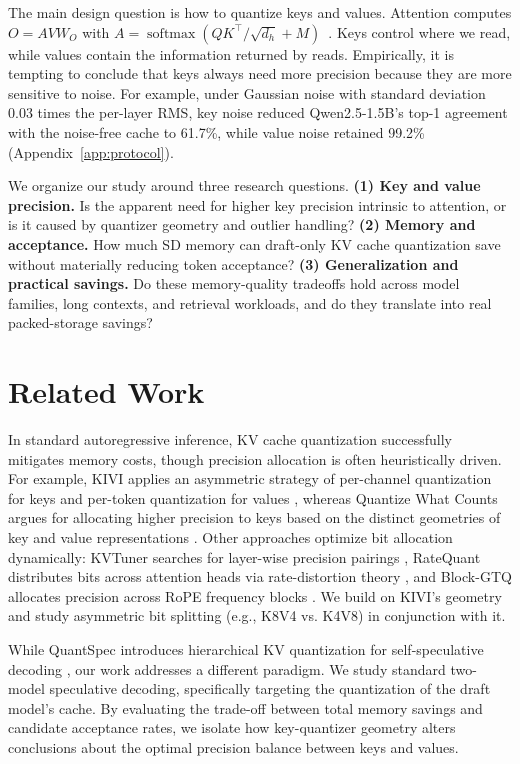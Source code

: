 \documentclass{article}
\begin{document}
The main design question is how to quantize keys and values. Attention computes $O=AVW_O$ with $A=\operatorname{softmax}(QK^\top/\sqrt{d_h}+M)$~\citep{vaswani2023attention}. Keys control where we read, while values contain the information returned by reads. Empirically, it is tempting to conclude that keys
always need more precision because they are more sensitive to noise. For example, under Gaussian noise with standard deviation 0.03 times the per-layer RMS, key noise reduced Qwen2.5-1.5B's top-1 agreement with the noise-free cache to 61.7\%, while value noise retained 99.2\% (Appendix~\ref{app:protocol}).

We organize our study around three research questions. \textbf{(1) Key and value precision.} Is the apparent need for higher key precision intrinsic to attention, or is it caused by quantizer geometry and outlier handling? \textbf{(2) Memory and acceptance.} How much SD memory can draft-only KV cache quantization save without materially reducing token acceptance? \textbf{(3) Generalization and practical savings.} Do these memory-quality tradeoffs hold across model families, long contexts, and retrieval workloads, and do they translate into real packed-storage savings?

\section{Related Work}

In standard autoregressive inference, KV cache quantization successfully mitigates memory costs, though precision allocation is often heuristically driven. For example, KIVI applies an asymmetric strategy of per-channel quantization for keys and per-token quantization for values \citep{liu2024kivi}, whereas Quantize What Counts argues for allocating higher precision to keys based on the distinct geometries of key and value representations \citep{hariri2026quantize}. Other approaches optimize bit allocation dynamically: KVTuner searches for layer-wise precision pairings \citep{li2025kvtuner}, RateQuant distributes bits across attention heads via rate-distortion theory \citep{zuo2026ratequant}, and Block-GTQ allocates precision across RoPE frequency blocks \citep{liang2026blockgtq}. We build on KIVI's geometry and study asymmetric bit splitting (e.g., K8V4 vs. K4V8) in conjunction with it.

While QuantSpec introduces hierarchical KV quantization for self-speculative decoding \citep{tiwari2025quantspec}, our work addresses a different paradigm. We study standard two-model speculative decoding, specifically targeting the quantization of the draft model's cache. By evaluating the trade-off between total memory savings and candidate acceptance rates, we isolate how key-quantizer geometry alters conclusions about the optimal precision balance between keys and values.
\end{document}
